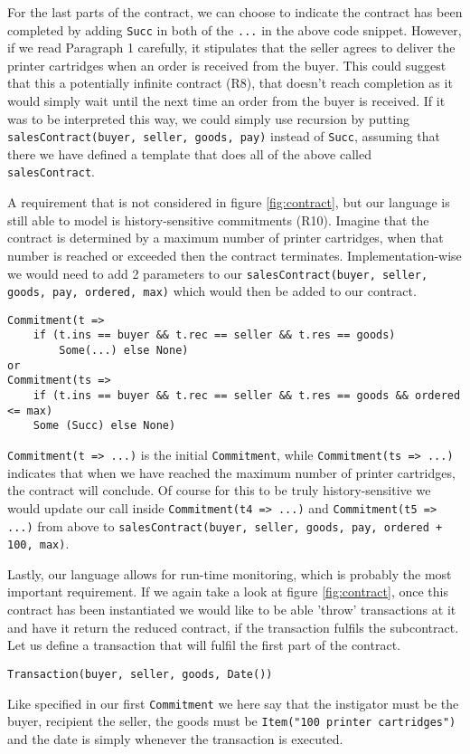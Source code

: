 \documentclass{ituthesis}
\begin{document}
For the last parts of the contract, we can choose to indicate the contract has been completed by adding \texttt{Succ} in both of the \texttt{...} in the above code snippet. However, if we read Paragraph 1 carefully, it stipulates that the seller agrees to deliver the printer cartridges when an order is received from the buyer. This could suggest that this a potentially infinite contract (R8), that doesn't reach completion as it would simply wait until the next time an order from the buyer is received. If it was to be interpreted this way, we could simply use recursion by putting \texttt{salesContract(buyer, seller, goods, pay)} instead of \texttt{Succ}, assuming that there we have defined a template that does all of the above called \texttt{salesContract}.

A requirement that is not considered in figure \ref{fig:contract}, but our language is still able to model is history-sensitive commitments (R10). Imagine that the contract is determined by a maximum number of printer cartridges, when that number is reached or exceeded then the contract terminates. Implementation-wise we would need to add 2 parameters to our \texttt{salesContract(buyer, seller, goods, pay, ordered, max)} which would then be added to our contract.
\begin{lstlisting}
Commitment(t => 
    if (t.ins == buyer && t.rec == seller && t.res == goods) 
        Some(...) else None)
or
Commitment(ts => 
    if (t.ins == buyer && t.rec == seller && t.res == goods && ordered <= max)
    Some (Succ) else None)
\end{lstlisting}
\texttt{Commitment(t => ...)} is the initial \texttt{Commitment}, while \texttt{Commitment(ts => ...)} indicates that when we have reached the maximum number of printer cartridges, the contract will conclude. Of course for this to be truly history-sensitive we would update our call inside \texttt{Commitment(t4 => ...)} and \texttt{Commitment(t5 => ...)} from above to \texttt{salesContract(buyer, seller, goods, pay, ordered + 100, max)}.

Lastly, our language allows for run-time monitoring, which is probably the most important requirement. If we again take a look at figure \ref{fig:contract}, once this contract has been instantiated we would like to be able 'throw' transactions at it and have it return the reduced contract, if the transaction fulfils the subcontract. Let us define a transaction that will fulfil the first part of the contract.
\begin{lstlisting}
Transaction(buyer, seller, goods, Date())
\end{lstlisting}{}
Like specified in our first \texttt{Commitment} we here say that the instigator must be the buyer, recipient the seller, the goods must be \texttt{Item("100 printer cartridges")} and the date is simply whenever the transaction is executed.
\end{document}
